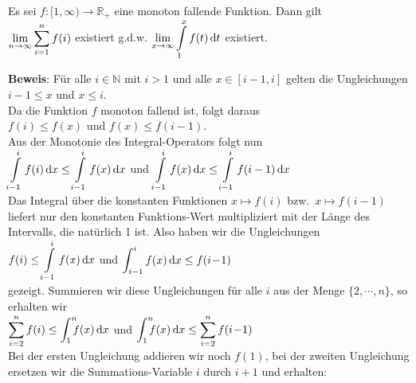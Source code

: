 \begin{Satz}
Es sei $f:[1,\infty) \rightarrow\mathbb{R}_+$ eine monoton fallende Funktion.  Dann gilt
\\[0.2cm]
\hspace*{1.3cm}
$\displaystyle \lim\limits_{n \rightarrow \infty} \sum\limits_{i=1}^n f(i)$ existiert \quad g.d.w. \quad
$\displaystyle \lim\limits_{x \rightarrow \infty} \int\limits_1^x f(t)\,\textrm{d} t$ existiert.  
\end{Satz}

\noindent
\textbf{Beweis}:
F\"ur alle $i\in \mathbb{N}$ mit $i>1$ und alle $x \in [i-1,i]$ gelten die Ungleichungen
\\[0.2cm]
\hspace*{1.3cm}
$i-1 \leq x$ \quad und \quad $x \leq i$.
\\[0.2cm]
Da die Funktion $f$ monoton fallend ist, folgt daraus
\\[0.2cm]
\hspace*{1.3cm}
$f(i) \leq f(x)$ \quad und \quad $f(x) \leq f(i-1)$.
\\[0.2cm]
Aus der Monotonie des Integral-Operators folgt nun
\\[0.2cm]
\hspace*{1.3cm}
$\displaystyle\int\limits_{i-1}^{i} f(i)\, \textrm{d} x \leq \int\limits_{i-1}^{i} f(x)\, \textrm{d} x$
\quad und \quad
$\displaystyle \int\limits_{i-1}^i f(x)\, \textrm{d} x \leq \int\limits_{i-1}^i f(i-1)\, \textrm{d} x$
\\[0.2cm]
Das Integral \"uber die konstanten Funktionen $x \mapsto f(i)$ bzw.~$x \mapsto f(i-1)$
liefert nur den konstanten Funktions-Wert multipliziert mit der L\"ange des Intervalls, die nat\"urlich 1
ist.  Also haben wir die Ungleichungen
\\[0.2cm]
\hspace*{1.3cm}
$\displaystyle f(i) \leq \int\limits_{i-1}^{i} f(x)\, \textrm{d} x$
\quad und \quad
$\displaystyle\int_{i-1}^{i} f(x)\, \textrm{d} x \leq f(i\!-\!1)$
\\[0.2cm]
gezeigt.  Summieren wir diese Ungleichungen f\"ur alle $i$ aus der Menge $\{2,\cdots,n\}$,
  so erhalten wir 
\\[0.2cm]
\hspace*{1.3cm}
$\ds\sum\limits_{i=2}^n f(i) \leq \dint{1}{n} f(x)\, \dr x$
\quad und \quad
$\dint{1}{n} f(x)\, \dr x \leq \sum\limits_{i=2}^n f(i\!-\!1)$
\\[0.2cm]
Bei der ersten Ungleichung addieren wir noch $f(1)$, bei der zweiten Ungleichung ersetzen
wir die Summations-Variable $i$ durch $i+1$ und erhalten:
\\[0.2cm]
